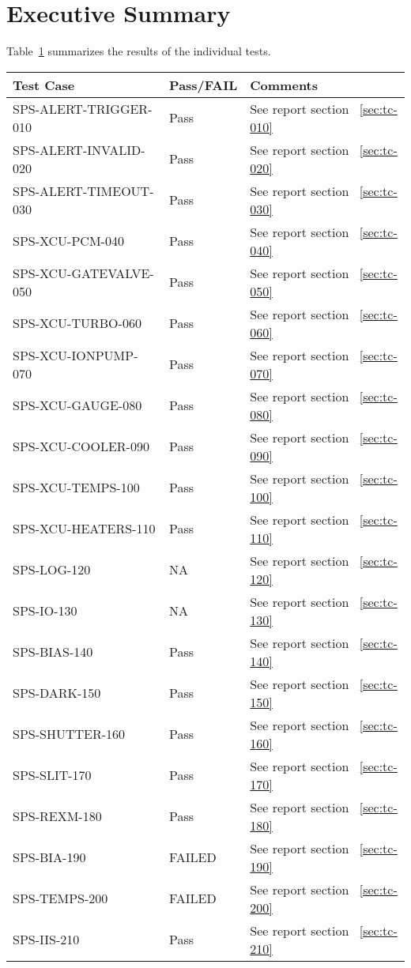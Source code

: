 \section{Executive Summary}

Table~\ref{tab:summary-table} summarizes the results of the individual tests.

\begin{table}[H]
    \begin{tabular}{|p{6cm}|l| p{7cm} | }
    \hline
    {\bf Test Case} & {\bf Pass/FAIL} & {\bf Comments} \\ \hline
    SPS-ALERT-TRIGGER-010 & Pass & See report section ~\ref{sec:tc-010} \\ \hline
    SPS-ALERT-INVALID-020 & Pass & See report section ~\ref{sec:tc-020} \\ \hline
    SPS-ALERT-TIMEOUT-030 & Pass & See report section ~\ref{sec:tc-030} \\ \hline
    SPS-XCU-PCM-040 & Pass & See report section ~\ref{sec:tc-040} \\ \hline
    SPS-XCU-GATEVALVE-050 & Pass & See report section ~\ref{sec:tc-050} \\ \hline
    SPS-XCU-TURBO-060 & Pass & See report section ~\ref{sec:tc-060} \\ \hline
    SPS-XCU-IONPUMP-070 & Pass & See report section ~\ref{sec:tc-070} \\ \hline
    SPS-XCU-GAUGE-080 & Pass & See report section ~\ref{sec:tc-080} \\ \hline
    SPS-XCU-COOLER-090 & Pass & See report section ~\ref{sec:tc-090} \\ \hline
    SPS-XCU-TEMPS-100 & Pass & See report section ~\ref{sec:tc-100} \\ \hline
    SPS-XCU-HEATERS-110 & Pass & See report section ~\ref{sec:tc-110} \\ \hline
    SPS-LOG-120 & NA & See report section ~\ref{sec:tc-120} \\ \hline
    SPS-IO-130 & NA & See report section ~\ref{sec:tc-130} \\ \hline
    SPS-BIAS-140 & Pass & See report section ~\ref{sec:tc-140} \\ \hline
    SPS-DARK-150 & Pass & See report section ~\ref{sec:tc-150} \\ \hline
    SPS-SHUTTER-160 & Pass & See report section ~\ref{sec:tc-160} \\ \hline
    SPS-SLIT-170 & Pass & See report section ~\ref{sec:tc-170} \\ \hline
    SPS-REXM-180 & Pass & See report section ~\ref{sec:tc-180} \\ \hline
    SPS-BIA-190 & FAILED & See report section ~\ref{sec:tc-190} \\ \hline
    SPS-TEMPS-200 & FAILED & See report section ~\ref{sec:tc-200} \\ \hline
    SPS-IIS-210 & Pass & See report section ~\ref{sec:tc-210} \\ \hline

    \end{tabular}
\label{tab:summary-table}
\end{table}

